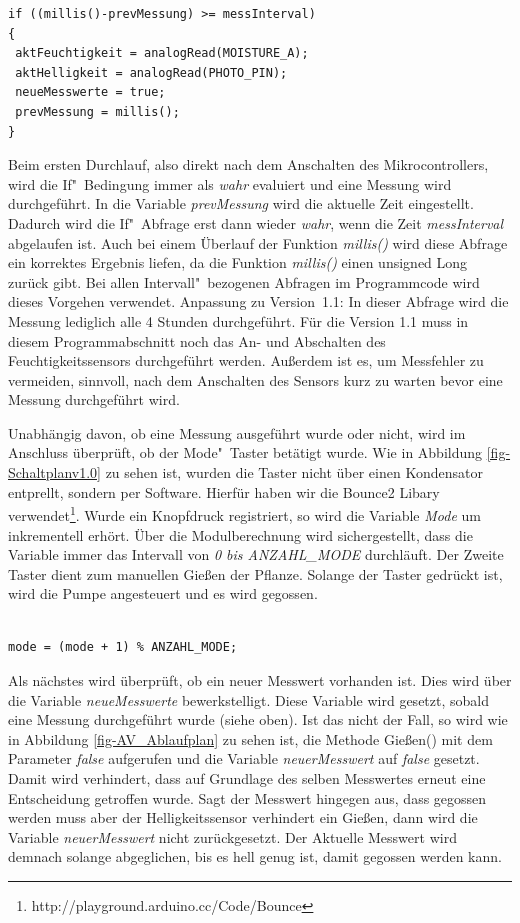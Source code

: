 \begin{lstlisting}[basicstyle=\small]
if ((millis()-prevMessung) >= messInterval)
{
 aktFeuchtigkeit = analogRead(MOISTURE_A);
 aktHelligkeit = analogRead(PHOTO_PIN);
 neueMesswerte = true; 
 prevMessung = millis();
}
\end{lstlisting}

Beim ersten Durchlauf, also direkt nach dem Anschalten des Mikrocontrollers, wird die If"~Bedingung immer als \emph{wahr} evaluiert und eine Messung wird durchgeführt. In die Variable \emph{prevMessung} wird die aktuelle Zeit eingestellt. Dadurch wird die If"~Abfrage erst dann wieder \emph{wahr}, wenn die Zeit \emph{messInterval} abgelaufen ist. Auch bei einem Überlauf der Funktion \emph{millis()} wird diese Abfrage ein korrektes Ergebnis liefen, da die Funktion \emph{millis()} einen unsigned Long zurück gibt. Bei allen Intervall"~bezogenen Abfragen im Programmcode wird dieses Vorgehen verwendet. 
Anpassung zu Version~1.1: In dieser Abfrage wird die Messung lediglich alle 4 Stunden durchgeführt. Für die Version 1.1 muss in diesem Programmabschnitt noch das An- und Abschalten des Feuchtigkeitssensors durchgeführt werden. Außerdem ist es, um Messfehler zu vermeiden, sinnvoll, nach dem Anschalten des Sensors kurz zu warten bevor eine Messung durchgeführt wird.

Unabhängig davon, ob eine Messung ausgeführt wurde oder nicht, wird im Anschluss überprüft, ob der Mode"~Taster betätigt wurde. Wie in Abbildung \ref{fig-Schaltplanv1.0} zu sehen ist, wurden die Taster nicht über einen Kondensator entprellt, sondern per Software. Hierfür haben wir die Bounce2 Libary verwendet\footnote{http://playground.arduino.cc/Code/Bounce}. Wurde ein Knopfdruck registriert, so wird die Variable \emph{Mode} um inkrementell erhört. Über die Modulberechnung wird sichergestellt, dass die Variable immer das Intervall von \emph{0 bis ANZAHL\_MODE} durchläuft. Der Zweite Taster dient zum manuellen Gießen der Pflanze. Solange der Taster gedrückt ist, wird die Pumpe angesteuert und es wird gegossen. 

\begin{lstlisting}[basicstyle=\small]

mode = (mode + 1) % ANZAHL_MODE;

\end{lstlisting}

Als nächstes wird überprüft, ob ein neuer Messwert vorhanden ist.
Dies wird über die Variable \emph{neueMesswerte} bewerkstelligt. Diese Variable wird gesetzt, sobald eine Messung durchgeführt wurde (siehe oben).
Ist das nicht der Fall, so wird wie in Abbildung \ref{fig-AV_Ablaufplan} zu sehen ist, die Methode Gießen() mit dem Parameter \emph{false} aufgerufen und die Variable \emph{neuerMesswert} auf \emph{false} gesetzt.
Damit wird verhindert, dass auf Grundlage des selben Messwertes erneut eine Entscheidung getroffen wurde.
Sagt der Messwert hingegen aus, dass gegossen werden muss aber der Helligkeitssensor verhindert ein Gießen, dann wird die Variable \emph{neuerMesswert} nicht zurückgesetzt.
Der Aktuelle Messwert wird demnach solange abgeglichen, bis es hell genug ist, damit gegossen werden kann.


